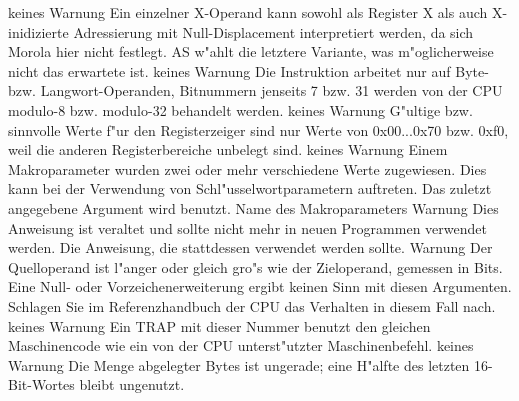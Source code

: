 \documentclass[12pt,a4paper,twoside]{report}
\begin{document}
\begin{description}
               {keines}
               {Warnung}
               {Ein einzelner X-Operand kann sowohl als Register X als
                auch X-inidizierte Adressierung mit Null-Displacement
                interpretiert werden, da sich Morola hier nicht festlegt.
                AS w"ahlt die letztere Variante, was m"oglicherweise nicht
                das erwartete ist.}
               {keines}
               {Warnung}
               {Die Instruktion arbeitet nur auf Byte- bzw.
                Langwort-Operanden, Bitnummern jenseits 7 bzw. 31 werden
                von der CPU modulo-8 bzw. modulo-32 behandelt werden.}
               {keines}
               {Warnung}
               {G"ultige bzw. sinnvolle Werte f"ur den Registerzeiger sind
                nur Werte von 0x00...0x70 bzw. 0xf0, weil die anderen
                Registerbereiche unbelegt sind.}
               {keines}
               {Warnung}
               {Einem Makroparameter wurden zwei oder mehr
                verschiedene Werte zugewiesen.  Dies kann bei der
                Verwendung von Schl"usselwortparametern auftreten.
                Das zuletzt angegebene Argument wird benutzt.}
               {Name des Makroparameters}
               {Warnung}
               {Dies Anweisung ist veraltet und sollte nicht mehr
                in neuen Programmen verwendet werden.}
               {Die Anweisung, die stattdessen verwendet werden sollte.}
               {Warnung}
               {Der Quelloperand ist l"anger oder gleich gro"s wie der
                Zieloperand, gemessen in Bits.  Eine Null- oder Vorzeichenerweiterung
                ergibt keinen Sinn mit diesen Argumenten.  Schlagen Sie im 
                Referenzhandbuch der CPU das Verhalten in diesem Fall nach.}
               {keines}
               {Warnung}
               {Ein TRAP mit dieser Nummer benutzt den gleichen Maschinencode
                wie ein von der CPU unterst"utzter Maschinenbefehl.}
               {keines}
               {Warnung}
               {Die Menge abgelegter Bytes ist ungerade; eine H"alfte des letzten
                16-Bit-Wortes bleibt ungenutzt.}

\end{description}
\end{document}
